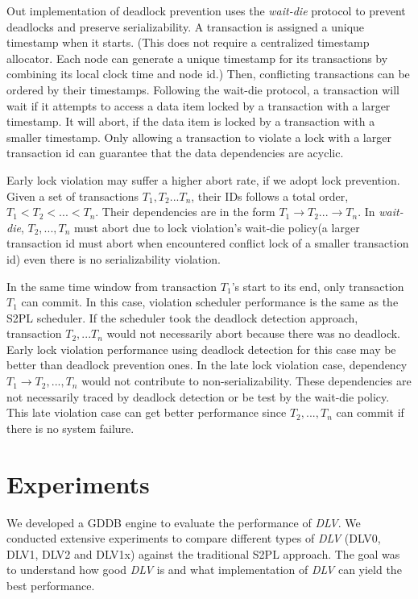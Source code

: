 \documentclass[conference]{IEEEtran}
\begin{document}

Out implementation of deadlock prevention uses the \emph{wait-die} protocol to prevent deadlocks and preserve serializability.
A transaction is assigned a unique timestamp when it starts.
(This does not require a centralized timestamp allocator.
Each node can generate a unique timestamp for its transactions by combining its local clock time and node id.)
Then, conflicting transactions can be ordered by their timestamps.
Following the wait-die protocol, a transaction will wait if it attempts to access a data item locked by a transaction with a larger timestamp.
It will abort, if the data item is locked by a transaction with a smaller timestamp.
Only allowing a transaction to violate a lock with a larger transaction id can guarantee that the data dependencies are acyclic.


Early lock violation may suffer a higher abort rate, if we adopt lock prevention.
Given a set of transactions ${T_1, T_2... T_n}$, their IDs follows a total order, ${T_1 < T_2 < ... < T_n}$.
Their dependencies are in the form ${T_1 \rightarrow T_2 ... \rightarrow T_n}$.
In \emph{wait-die}, ${T_2, ..., T_n}$ must abort due to lock violation's wait-die policy(a larger transaction id must abort when encountered conflict lock of a smaller transaction id) even there is no serializability violation.

In the same time window from transaction ${T_1}$'s start to its end, only transaction ${T_1}$ can commit.
In this case, violation scheduler performance is the same as the S2PL scheduler.
If the scheduler took the deadlock detection approach, transaction ${T_2, ... T_n}$ would not necessarily abort because there was no deadlock.
Early lock violation performance using deadlock detection for this case may be better than deadlock prevention ones.
In the late lock violation case, dependency ${T_1 \rightarrow T_2 , ... ,T_n}$ would not contribute to non-serializability.
These dependencies are not necessarily traced by deadlock detection or be test by the wait-die policy.
This late violation case can get better performance since ${T_2,..., T_n}$ can commit if there is no system failure.

\section{Experiments}
\label{sec:experiment}
We developed a GDDB engine to evaluate the performance of \emph{DLV}.
We conducted extensive experiments to compare different types of \emph{DLV} (DLV0, DLV1, DLV2 and DLV1x) against the traditional S2PL approach.
The goal was to understand how good \emph{DLV} is and what implementation of \emph{DLV} can yield the best performance. 
\end{document}
